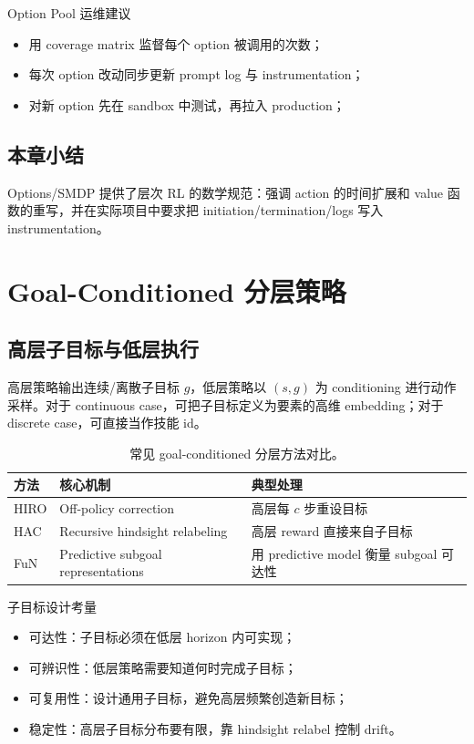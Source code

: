 \documentclass[a4paper]{article}
\begin{document}
\begin{importantbox}{Option Pool 运维建议}
\begin{itemize}
    \item 用 coverage matrix 监督每个 option 被调用的次数；
    \item 每次 option 改动同步更新 prompt log 与 instrumentation；
    \item 对新 option 先在 sandbox 中测试，再拉入 production；
\end{itemize}
\end{importantbox}

\subsection{本章小结}

Options/SMDP 提供了层次 RL 的数学规范：强调 action 的时间扩展和 value 函数的重写，并在实际项目中要求把 initiation/termination/logs 写入 instrumentation。

\section{Goal-Conditioned 分层策略}

\subsection{高层子目标与低层执行}

高层策略输出连续/离散子目标 \(g\)，低层策略以 \((s, g)\) 为 conditioning 进行动作采样。对于 continuous case，可把子目标定义为要素的高维 embedding；对于 discrete case，可直接当作技能 id。

\begin{table}[H]
\centering
\begin{tabular}{p{3cm}p{5cm}p{4cm}}
\toprule
方法 & 核心机制 & 典型处理 \\
\midrule
HIRO & Off-policy correction & 高层每 $c$ 步重设目标 \\
HAC & Recursive hindsight relabeling & 高层 reward 直接来自子目标 \\
FuN & Predictive subgoal representations & 用 predictive model 衡量 subgoal 可达性 \\
\bottomrule
\end{tabular}
\caption{常见 goal-conditioned 分层方法对比。}
\end{table}

\begin{knowledgebox}{子目标设计考量}
\begin{itemize}
    \item 可达性：子目标必须在低层 horizon 内可实现；
    \item 可辨识性：低层策略需要知道何时完成子目标；
    \item 可复用性：设计通用子目标，避免高层频繁创造新目标；
    \item 稳定性：高层子目标分布要有限，靠 hindsight relabel 控制 drift。
\end{itemize}
\end{knowledgebox}
\end{document}
